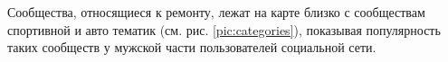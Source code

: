 \documentclass[times,specification,annotation]{itmo-student-thesis}
\begin{document}
Сообщества, относящиеся к ремонту, лежат на карте близко с сообществам спортивной и авто тематик (см. рис. \ref{pic:categories}), показывая популярность таких сообществ у мужской части пользователей социальной сети.    


\startconclusionpage


\printmainbibliography

\appendix
\end{document}
